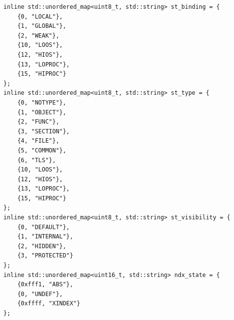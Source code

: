 \documentclass{article}
\begin{document}
\begin{lstlisting}
inline std::unordered_map<uint8_t, std::string> st_binding = {
	{0, "LOCAL"},
	{1, "GLOBAL"},
	{2, "WEAK"},
	{10, "LOOS"},
	{12, "HIOS"},
	{13, "LOPROC"},
	{15, "HIPROC"}
};
inline std::unordered_map<uint8_t, std::string> st_type = {
	{0, "NOTYPE"},
	{1, "OBJECT"},
	{2, "FUNC"},
	{3, "SECTION"},
	{4, "FILE"},
	{5, "COMMON"},
	{6, "TLS"},
	{10, "LOOS"},
	{12, "HIOS"},
	{13, "LOPROC"},
	{15, "HIPROC"}
};
inline std::unordered_map<uint8_t, std::string> st_visibility = {
	{0, "DEFAULT"},
	{1, "INTERNAL"},
	{2, "HIDDEN"},
	{3, "PROTECTED"}
};
inline std::unordered_map<uint16_t, std::string> ndx_state = {
	{0xfff1, "ABS"},
	{0, "UNDEF"},
	{0xffff, "XINDEX"}
};
\end{lstlisting}
\end{document}
